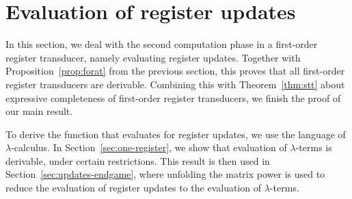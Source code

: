 
\section{Evaluation of register updates}
\label{sec:stt-derivable}
In this section, we deal with the second computation phase in a first-order register transducer, namely evaluating register updates. Together with Proposition~\ref{prop:forat} from the previous section, this proves that all first-order register transducers are derivable. Combining this with  Theorem~\ref{thm:stt} about expressive completeness of first-order register transducers, we finish the proof of our main result. 


To derive the function that   evaluates for register updates, we  use the language of $\lambda$-calculus.  In Section~\ref{sec:one-register},  we show that evaluation of $\lambda$-terms is derivable, under certain restrictions. This result is then used in Section~\ref{sec:updates-endgame}, where unfolding the matrix power is used to reduce the evaluation of register updates to the evaluation of $\lambda$-terms.  


%




